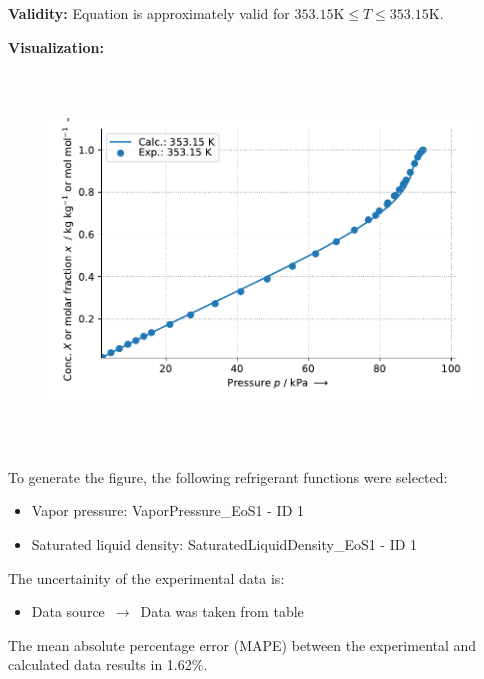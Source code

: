 \textbf{Validity:}
\newline
Equation is approximately valid for $353.15 \si{\kelvin} \leq T \leq 353.15 \si{\kelvin}$.
\newline

\textbf{Visualization:}
%
\begin{figure}[!htp]
{\noindent\includegraphics[height=10cm, keepaspectratio]{figs/abs/abs_2-Propanol_ionic_liquid_[EMIM]+[(CF3SO2)2N]-_UniquacFixedDu_1.pdf}}
\end{figure}
%

To generate the figure, the following refrigerant functions were selected:
\begin{itemize}
\item Vapor pressure: VaporPressure\_EoS1 - ID 1
\item Saturated liquid density: SaturatedLiquidDensity\_EoS1 - ID 1
\end{itemize}

The uncertainity of the experimental data is:
\begin{itemize}
\item Data source $\,\to\,$ Data was taken from table
\end{itemize}

The mean absolute percentage error (MAPE) between the experimental and calculated data results in 1.62\%.
\FloatBarrier
\newpage
